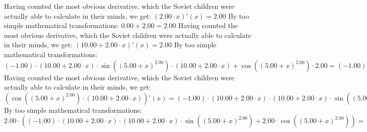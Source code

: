 \documentclass{article}
\begin{document}
 \newline
 \newline 
Having counted the most obvious derivative, which the Soviet children were actually able to calculate in their minds, we get:
$({{2.00} \cdot {x}})'(x) = {2.00}$\newline
\newline
By too simple mathematical transformations:
 ${{0.00} + {2.00}} = {2.00}$ 
 \newline
 \newline 
Having counted the most obvious derivative, which the Soviet children were actually able to calculate in their minds, we get:
$({{10.00} + {{2.00} \cdot {x}}})'(x) = {2.00}$\newline
\newline
By too simple mathematical transformations:
 ${{{\left({-1.00}\right) \cdot {\left({{10.00} + {{2.00} \cdot {x}}}\right) \cdot  \sin {\left({\left({{5.00} + {x}}\right) ^ {2.00}}\right)} }} \cdot \left({{10.00} + {{2.00} \cdot {x}}}\right)} + { \cos {\left({\left({{5.00} + {x}}\right) ^ {2.00}}\right)}  \cdot {2.00}}} = {{\left({-1.00}\right) \cdot {\left({{10.00} + {{2.00} \cdot {x}}}\right) \cdot {\left({{10.00} + {{2.00} \cdot {x}}}\right) \cdot  \sin {\left({\left({{5.00} + {x}}\right) ^ {2.00}}\right)} }}} + {{2.00} \cdot  \cos {\left({\left({{5.00} + {x}}\right) ^ {2.00}}\right)} }}$ 
 \newline
 \newline 
Having counted the most obvious derivative, which the Soviet children were actually able to calculate in their minds, we get:
$({ \cos {\left({\left({{5.00} + {x}}\right) ^ {2.00}}\right)}  \cdot \left({{10.00} + {{2.00} \cdot {x}}}\right)})'(x) = {{\left({-1.00}\right) \cdot {\left({{10.00} + {{2.00} \cdot {x}}}\right) \cdot {\left({{10.00} + {{2.00} \cdot {x}}}\right) \cdot  \sin {\left({\left({{5.00} + {x}}\right) ^ {2.00}}\right)} }}} + {{2.00} \cdot  \cos {\left({\left({{5.00} + {x}}\right) ^ {2.00}}\right)} }}$\newline
\newline
By too simple mathematical transformations:
 ${{2.00} \cdot \left({{\left({-1.00}\right) \cdot {\left({{10.00} + {{2.00} \cdot {x}}}\right) \cdot {\left({{10.00} + {{2.00} \cdot {x}}}\right) \cdot  \sin {\left({\left({{5.00} + {x}}\right) ^ {2.00}}\right)} }}} + {{2.00} \cdot  \cos {\left({\left({{5.00} + {x}}\right) ^ {2.00}}\right)} }}\right)} = {{\left({-2.00}\right) \cdot {\left({{10.00} + {{2.00} \cdot {x}}}\right) \cdot {\left({{10.00} + {{2.00} \cdot {x}}}\right) \cdot  \sin {\left({\left({{5.00} + {x}}\right) ^ {2.00}}\right)} }}} + {{4.00} \cdot  \cos {\left({\left({{5.00} + {x}}\right) ^ {2.00}}\right)} }}$ 
\end{document}
